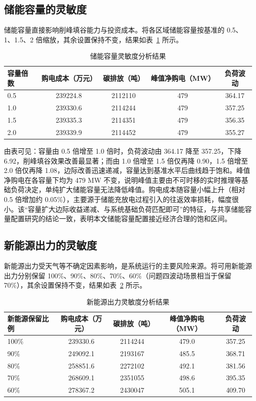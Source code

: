 \documentclass{ctexart}
\begin{document}
\subsection{储能容量的灵敏度}
储能容量直接影响削峰填谷能力与投资成本。将各区域储能容量按基准的 0.5、1、1.5、2 倍缩放，其余设置保持不变，结果如表~\ref{tab:sen_storage} 所示。
\begin{table}[H]
	\centering
	\caption{储能容量灵敏度分析结果}
	\label{tab:sen_storage}
	\begin{tabular}{lcccc}
		\toprule
		容量倍数 & 购电成本（万元） & 碳排放（吨） & 峰值净购电（MW） & 负荷波动 \\
		\midrule
		0.5 & 239224.8 & 2112110 & 479 & 364.17 \\
		1.0 & 239330.6 & 2114244 & 479 & 357.25 \\
		1.5 & 239335.3 & 2114351 & 479 & 356.35 \\
		2.0 & 239339.9 & 2114452 & 479 & 355.27 \\
		\bottomrule
	\end{tabular}
\end{table}
由表可见：容量由 0.5 倍增至 1.0 倍时，负荷波动由 364.17 降至 357.25，下降 6.92，削峰填谷效果改善最显著；而由 1.0 倍增至 1.5 倍仅再降 0.90，1.5 倍增至 2.0 倍仅再降 1.08，边际改善迅速递减，容量达到基准水平后曲线趋于饱和。峰值净购电在各容量下均为 479 MW 不变，说明峰值主要由不可时移的实时推理等基础负荷决定，单纯扩大储能容量无法降低峰值。购电成本随容量小幅上升（相对 0.5 倍增加约 0.05\%），主要源于储能充放电过程引入的往返效率损耗，幅度很小。该“容量扩大边际收益递减、与系统基础负荷匹配即可”的特征，与共享储能容量配置研究的结论一致\cite{qie2026,fanxiaochao2026}，表明本文储能容量配置接近经济合理的饱和区间。

\subsection{新能源出力的灵敏度}
新能源出力受天气等不确定因素影响，是系统运行的主要风险来源。将可用新能源出力分别保留 100\%、90\%、80\%、70\%、60\%（问题四波动场景相当于保留 70\%），其余设置保持不变，结果如表~\ref{tab:sen_renewable} 所示。
\begin{table}[H]
	\centering
	\caption{新能源出力灵敏度分析结果}
	\label{tab:sen_renewable}
	\begin{tabular}{lcccc}
		\toprule
		新能源保留比例 & 购电成本（万元） & 碳排放（吨） & 峰值净购电（MW） & 负荷波动 \\
		\midrule
		100\% & 239330.6 & 2114244 & 479.0 & 357.25 \\
		90\% & 249092.1 & 2193167 & 485.5 & 368.71 \\
		80\% & 258851.6 & 2272102 & 492.1 & 381.56 \\
		70\% & 268609.1 & 2351055 & 498.6 & 395.35 \\
		60\% & 278367.2 & 2430047 & 505.1 & 409.70 \\
		\bottomrule
	\end{tabular}
\end{table}
\end{document}
